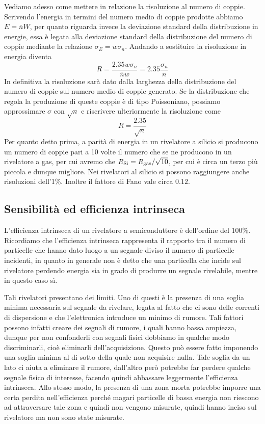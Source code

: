 Vediamo adesso come mettere in relazione la risoluzione al numero di coppie. Scrivendo l'energia in termini del numero medio di coppie prodotte abbiamo $E=\bar{n}W$, per quanto riguarda invece la deviazione standard della distribuzione in energie, essa è legata alla deviazione standard della distribuzione del numero di coppie mediante la relazione $\sigma_E=w \sigma_n$. Andando a sostituire la risoluzione in energia diventa
\begin{equation*}
   R
   =\frac{2.35w \sigma_n}{\bar{n} w}
   =2.35\frac{\sigma_n}{n}
\end{equation*}
In definitiva la risoluzione sarà dato dalla larghezza della distribuzione del numero di coppie sul numero medio di coppie generato. Se la distribuzione che regola la produzione di queste coppie è di tipo Poissoniano, possiamo approssimare $\sigma$ con $\sqrt{n}$ e riscrivere ulteriormente la risoluzione come
\begin{equation*}
   R=\frac{2.35}{\sqrt{n}}
\end{equation*}
Per quanto detto prima, a parità di energia in un rivelatore a silicio si producono un numero di coppie pari a 10 volte il numero che se ne producono in un rivelatore a gas, per cui avremo che $R_{\rm Si}=R_{\rm gas}/\sqrt{10}$, per cui è circa un terzo più piccola e dunque migliore. Nei rivelatori al silicio si possono raggiungere anche risoluzioni dell'1\%. Inoltre il fattore di Fano vale circa $0.12$.

\vspace{-0.15cm}

\subsection{Sensibilità ed efficienza intrinseca}

L'efficienza intrinseca di un rivelatore a semiconduttore è dell'ordine del 100\%. Ricordiamo che l'efficienza intrinseca rappresenta il rapporto tra il numero di particelle che hanno dato luogo a un segnale diviso il numero di particelle incidenti, in quanto in generale non è detto che una particella che incide sul rivelatore perdendo energia sia in grado di produrre un segnale rivelabile, mentre in questo caso sì.

Tali rivelatori presentano dei limiti. Uno di questi è la presenza di una soglia minima necessaria sul segnale da rivelare, legata al fatto che ci sono delle correnti di dispersione e che l'elettronica introduce un minimo di rumore. Tali fattori possono infatti creare dei segnali di rumore, i quali hanno bassa ampiezza, dunque per non confonderli con segnali fisici dobbiamo in qualche modo discriminarli, cioè eliminarli dell'acquisizione. Questo può essere fatto imponendo una soglia minima al di sotto della quale non acquisire nulla. Tale soglia da un lato ci aiuta a eliminare il rumore, dall'altro però potrebbe far perdere qualche segnale fisico di interesse, facendo quindi abbassare leggermente l'efficienza intrinseca. Allo stesso modo, la presenza di una zona morta potrebbe imporre una certa perdita nell'efficienza perché magari particelle di bassa energia non riescono ad attraversare tale zona e quindi non vengono misurate, quindi hanno inciso sul rivelatore ma non sono state misurate.

